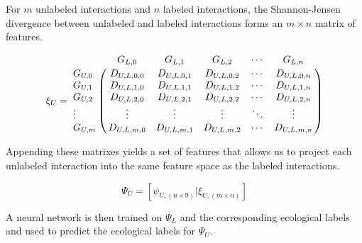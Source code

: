 \noindent For $m$ unlabeled interactions and $n$ labeled interactions, the Shannon-Jensen divergence between unlabeled and labeled interactions forms an $m\times n$ matrix of features.

\begin{equation}
\xi_U =
\bordermatrix{
        & G_{L,0}     & G_{L,1}     & G_{L,2}     & \cdots & G_{L,n}     \cr
G_{U,0} & D_{U,L,0,0} & D_{U,L,0,1} & D_{U,L,0,2} & \cdots & D_{U,L,0,n} \cr
G_{U,1} & D_{U,L,1,0} & D_{U,L,1,1} & D_{U,L,1,2} & \cdots & D_{U,L,1,n} \cr
G_{U,2} & D_{U,L,2,0} & D_{U,L,2,1} & D_{U,L,2,2} & \cdots & D_{U,L,2,n} \cr
\vdots  & \vdots      & \vdots      & \vdots      & \ddots & \vdots      \cr
G_{U,m} & D_{U,L,m,0} & D_{U,L,m,1} & D_{U,L,m,2} & \cdots & D_{U,L,m,n} \cr
}
\end{equation}

\noindent Appending these matrixes yields a set of features that allows us to project each unlabeled interaction into the same feature space as the labeled interactions.

\begin{equation}
    \Psi_{U} = \left[ \psi_{U,(n \times 9)} | \xi_{U,(m \times n)} \right]
\end{equation}

\noindent A neural network is then trained on $\Psi_L$ and the corresponding ecological labels and used to predict the ecological labels for $\Psi_U$. \cite{pedregosa2011scikit}